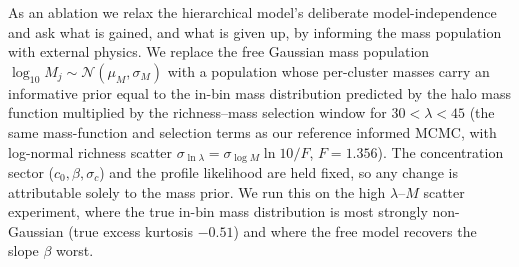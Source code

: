 
As an ablation we relax the hierarchical model's deliberate model-independence and ask what is gained,
and what is given up, by informing the mass population with external physics. We replace the free
Gaussian mass population $\log_{10}M_j \sim \mathcal{N}(\mu_M, \sigma_M)$ with a population whose
per-cluster masses carry an informative prior equal to the in-bin mass distribution predicted by the
\citet{tinker2008} halo mass function multiplied by the \citet{mcclintock2019} richness--mass
selection window for $30 < \lambda < 45$ (the same mass-function and selection terms as our reference
informed MCMC, with log-normal richness scatter $\sigma_{\ln\lambda}=\sigma_{\log M}\ln 10/F$,
$F=1.356$). The concentration sector ($c_0,\beta,\sigma_c$) and the profile likelihood are held fixed,
so any change is attributable solely to the mass prior. We run this on the high $\lambda$--$M$ scatter
experiment, where the true in-bin mass distribution is most strongly non-Gaussian (true excess
kurtosis $-0.51$) and where the free model recovers the slope $\beta$ worst.

